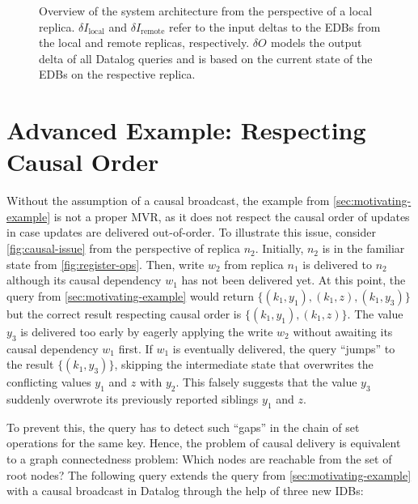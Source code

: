 \documentclass{article}
\newcommand{\deltaI}[1]{\(\delta I_{\text{#1}}\)}
\newcommand{\deltaO}[1][]{\(\delta O_{\text{#1}}\)}
\begin{document}
\begin{figure*}

	\caption{
		Overview of the system architecture from the perspective of a local
		replica.
		\deltaI{local} and \deltaI{remote} refer to the input deltas to
		the EDBs from the local and remote replicas, respectively.
		\deltaO{} models the output delta of all Datalog queries and is based on
		the current state of the EDBs on the respective replica.
	}
	\label{fig:system-overview}
\end{figure*}

\section{Advanced Example: Respecting Causal Order}
\label{sec:advanced-example}

Without the assumption of a causal broadcast,
the example from \autoref{sec:motivating-example} is not a proper MVR,
as it does not respect the causal order of updates in case updates are delivered
out-of-order.
To illustrate this issue, consider \autoref{fig:causal-issue} from the
perspective of replica \(n_2\).
Initially, \(n_2\) is in the familiar state from \autoref{fig:register-ops}.
Then, write \(w_2\) from replica \(n_1\) is delivered to \(n_2\) although its
causal dependency \(w_1\) has not been delivered yet.
At this point, the query from \autoref{sec:motivating-example} would return
\(\{ (k_1, y_1), (k_1, z), (k_1, y_3)\} \)
but the correct result respecting causal order is
\(\{ (k_1, y_1), (k_1, z) \}\).
The value \(y_3\) is delivered too early by eagerly applying the write \(w_2\)
without awaiting its causal dependency \(w_1\) first.
If \(w_1\) is eventually delivered, the query ``jumps'' to the result
\( \{ (k_1, y_3) \} \), skipping the intermediate state
that overwrites the conflicting values \(y_1\) and \(z\) with \(y_2\).
This falsely suggests that the value \(y_3\) suddenly overwrote its previously
reported siblings \(y_1\) and \(z\).

To prevent this, the query has to detect such ``gaps'' in the chain of set
operations for the same key.
Hence, the problem of causal delivery is equivalent to a graph connectedness
problem: Which nodes are reachable from the set of root nodes?
The following query extends the query from \autoref{sec:motivating-example}
with a causal broadcast in Datalog through the help of three new IDBs:
\end{document}
